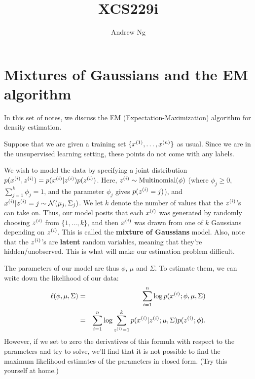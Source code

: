 \documentclass{article}
\begin{document}
\title{XCS229i}
\author{Andrew Ng}
\date{}
\maketitle




\section*{Mixtures of Gaussians and the EM algorithm}

In this set of notes, we discuss the EM (Expectation-Maximization) algorithm
for density estimation.

Suppose that we are given a training set $\{x^{(1)}, \ldots, x^{({n})}\}$
as usual.  Since we are in the unsupervised learning setting, these
points do not come with any labels.

We wish to model the data by specifying a joint
distribution $p({x^{(i)}}, {z^{(i)}}) = p({x^{(i)}}|{z^{(i)}}) p({z^{(i)}})$.
Here, ${z^{(i)}} \sim {\rm Multinomial}(\phi)$ (where $\phi_j \geq 0$, $\sum_{j=1}^k \phi_j=1$,
and the parameter $\phi_j$ gives $p({z^{(i)}} = j)$),
and ${x^{(i)}} | {z^{(i)}}=j \sim {\cal N}(\mu_j, \Sigma_j)$.  We let $k$ denote the
number of values that the ${z^{(i)}}$'s can take on.  Thus, our model posits
that each ${x^{(i)}}$ was generated by randomly choosing ${z^{(i)}}$ from
$\{1, \ldots, k\}$, and then ${x^{(i)}}$ was drawn from one of $k$ Gaussians
depending on ${z^{(i)}}$.
This is called the {\bf mixture of Gaussians} model.
Also, note that the ${z^{(i)}}$'s are {\bf latent} random variables,
meaning that they're hidden/unobserved.  This is what will make our
estimation problem difficult.

The parameters of our model are thus $\phi$, $\mu$ and $\Sigma$.  To
estimate them, we can write down the likelihood of our data:
\begin{eqnarray*}
\ell(\phi, \mu, \Sigma) &=& \sum_{i=1}^{n} \log p({x^{(i)}}; \phi, \mu, \Sigma) \\
&=& \sum_{i=1}^{n} \log \sum_{{z^{(i)}}=1}^k p({x^{(i)}}| {z^{(i)}}; \mu, \Sigma) p({z^{(i)}};\phi).
\end{eqnarray*}
However, if we set to zero the derivatives of this formula with respect to the
parameters and try to solve, we'll find that it is not
possible to find the maximum likelihood estimates of the parameters
in closed form.  (Try this yourself at home.)
\end{document}
